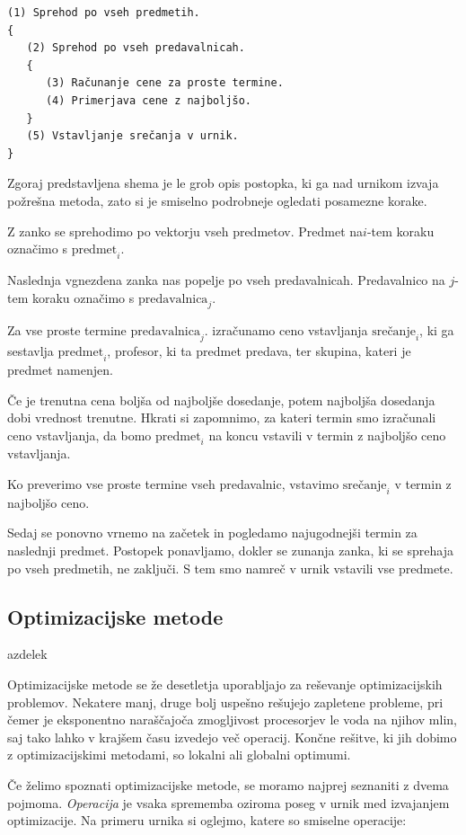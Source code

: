 \documentclass[a4paper,10pt]{article}
\begin{document}
\begin{verbatim}
(1) Sprehod po vseh predmetih.
{
   (2) Sprehod po vseh predavalnicah.
   {
      (3) Računanje cene za proste termine.
      (4) Primerjava cene z najboljšo.
   }
   (5) Vstavljanje srečanja v urnik.
}
\end{verbatim}
\noindent
Zgoraj predstavljena shema je le grob opis postopka, ki ga nad urnikom izvaja požrešna metoda,
zato si je smiselno podrobneje ogledati posamezne korake.

   Z zanko se sprehodimo po vektorju vseh predmetov. Predmet na$i$-tem koraku
   označimo s $\text{predmet}_i$.

   Naslednja vgnezdena zanka nas popelje po vseh predavalnicah. Predavalnico na
   $j$-tem koraku označimo s $\text{predavalnica}_j$.

   Za vse proste termine $\text{predavalnica}_j$. izračunamo ceno vstavljanja
   $\text{srečanje}_i$, ki ga sestavlja $\text{predmet}_i$, profesor, ki ta predmet predava,
   ter skupina, kateri je predmet namenjen.

   Če je trenutna cena boljša od najboljše dosedanje, potem najboljša dosedanja
   dobi vrednost trenutne. Hkrati si zapomnimo, za kateri termin smo izračunali ceno
   vstavljanja, da bomo $\text{predmet}_i$ na koncu vstavili v termin z najboljšo
   ceno vstavljanja.

   Ko preverimo vse proste termine vseh predavalnic, vstavimo $\text{srečanje}_i$
   v termin z najboljšo ceno.

   Sedaj se ponovno vrnemo na začetek in pogledamo najugodnejši termin za naslednji
   predmet. Postopek ponavljamo, dokler se zunanja zanka, ki se sprehaja po vseh predmetih,
   ne zaključi. S tem smo namreč v urnik vstavili vse predmete.

\subsection{Optimizacijske metode }azdelek

Optimizacijske metode se že desetletja uporabljajo za reševanje optimizacijskih problemov.
Nekatere manj, druge bolj uspešno rešujejo zapletene probleme, pri čemer je eksponentno
naraščajoča zmogljivost procesorjev le voda na njihov mlin, saj tako lahko v krajšem
času izvedejo več operacij. Končne rešitve, ki jih dobimo z optimizacijskimi metodami,
so lokalni ali globalni optimumi.

Če želimo spoznati optimizacijske metode, se moramo najprej seznaniti z dvema pojmoma.
\emph{Operacija} je vsaka sprememba oziroma poseg v urnik med izvajanjem optimizacije.
Na primeru urnika si oglejmo, katere so smiselne operacije:
\end{document}
